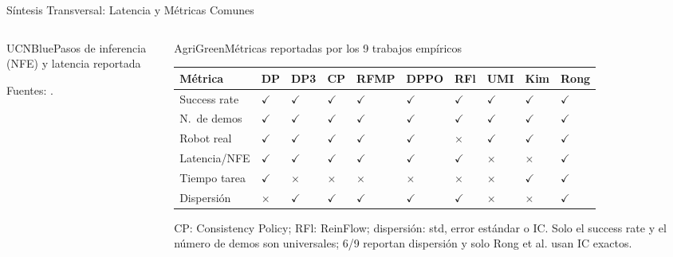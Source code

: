 \documentclass[aspectratio=169,10pt,xcolor={dvipsnames,table}]{beamer}
\newcommand{\FootnoteFont}{\fontsize{5}{6.2}\selectfont}                %
\newcommand{\CardHeightTall}{46mm}         %
\newcommand{\CheckMark}{\textcolor{AgriGreen}{$\checkmark$}}
\newcommand{\CrossMark}{\textcolor{AlertRed}{$\times$}}
\newcommand{\RefNote}[1]{{\FootnoteFont\textcolor{TextDark!65}{\cite{#1}}}}
\newcommand{\TabFont}{\fontsize{5.3}{6.4}\selectfont}                    %
\begin{document}
\begin{frame}{Síntesis Transversal: Latencia y Métricas Comunes}
\begin{columns}[T, onlytextwidth]
\begin{column}{0.52\textwidth}
\begin{Card}[height=\CardHeightTall]{UCNBlue}{Pasos de inferencia (NFE) y latencia reportada}
{        \textcolor{TextDark!80}{Fuentes: \RefNote{chi2025diffusion,ze2024dp3,prasad2024consistency,ding2025rfmp,rong2026tomato}.}\par}
      \end{Card}
    \end{column}
    \begin{column}{0.46\textwidth}
      \begin{Card}[height=\CardHeightTall]{AgriGreen}{Métricas reportadas por los 9 trabajos empíricos}
        {\TabFont
        \setlength{\tabcolsep}{0.6pt}
        \renewcommand{\arraystretch}{1.2}
        \begin{tabular}{@{}L{13.5mm} *{9}{C{5.2mm}}@{}}
          \toprule
          \textbf{Métrica} & \textbf{DP} & \textbf{DP3} & \textbf{CP} & \textbf{RFMP} & \textbf{DPPO} & \textbf{RFl} & \textbf{UMI} & \textbf{Kim} & \textbf{Rong} \\
          \midrule
          Success rate & \CheckMark & \CheckMark & \CheckMark & \CheckMark & \CheckMark & \CheckMark & \CheckMark & \CheckMark & \CheckMark \\
          N.\ de demos & \CheckMark & \CheckMark & \CheckMark & \CheckMark & \CheckMark & \CheckMark & \CheckMark & \CheckMark & \CheckMark \\
          Robot real & \CheckMark & \CheckMark & \CheckMark & \CheckMark & \CheckMark & \CrossMark & \CheckMark & \CheckMark & \CheckMark \\
          Latencia/NFE & \CheckMark & \CheckMark & \CheckMark & \CheckMark & \CheckMark & \CheckMark & \CrossMark & \CrossMark & \CheckMark \\
          Tiempo tarea & \CheckMark & \CrossMark & \CrossMark & \CrossMark & \CrossMark & \CrossMark & \CrossMark & \CheckMark & \CheckMark \\
          Dispersión & \CrossMark & \CheckMark & \CheckMark & \CheckMark & \CheckMark & \CheckMark & \CrossMark & \CrossMark & \CheckMark \\
          \bottomrule
        \end{tabular}\par
        \vspace{1mm}
        \textcolor{TextDark!80}{CP: Consistency Policy; RFl: ReinFlow; dispersión: std, error estándar o IC. Solo el success rate y el número de demos son universales; 6/9 reportan dispersión y solo Rong et al. usan IC exactos.}\par}
      \end{Card}
    \end{column}
  \end{columns}
\end{frame}
\end{document}
